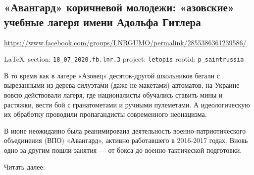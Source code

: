  
 
\subsection{«Авангард» коричневой молодежи: «азовские» учебные лагеря имени Адольфа Гитлера}
\label{sec:18_07_2020.fb.lnr.3}
\url{https://www.facebook.com/groups/LNRGUMO/permalink/2855386361239586/}
  
\vspace{0.5cm}
{\small\LaTeX~section: \verb|18_07_2020.fb.lnr.3| project: \verb|letopis| rootid: \verb|p_saintrussia|}
\vspace{0.5cm}
 
В то время как в лагере «Азовец» десяток-другой школьников бегали с вырезанными
из дерева силуэтами (даже не макетами) автоматов, на Украине вовсю действовали
лагеря, где националисты обучались ставить мины и растяжки, вести бой с
гранатометами и ручными пулеметами.  А идеологическую их обработку проводили
пропагандисты современного неонацизма.

В июне неожиданно была реанимирована деятельность военно-патриотического
объединения (ВПО) «Авангард», активно работавшего в 2016-2017 годах.  Вновь
одно за другим пошли занятия --- от бокса до военно-тактической подготовки.

Читать далее: 
